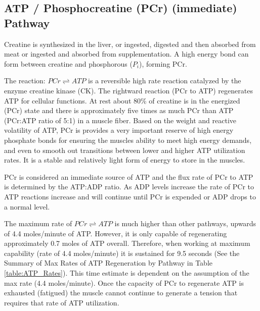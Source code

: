 \subsection{ATP / Phosphocreatine (PCr) (immediate) Pathway}

Creatine is synthesized in the liver, or ingested, digested and then absorbed from meat or ingested and absorbed from supplementation.\footnotemark{} A high energy bond can form between creatine and phosphorous ($P_i$), forming PCr.

The reaction: $PCr \rightleftharpoons ATP$ is a reversible high rate reaction catalyzed by the enzyme creatine kinase (CK). The rightward reaction (PCr to ATP) regenerates ATP for cellular functions. At rest about 80\% of creatine is in the energized (PCr) state and there is approximately five times as much PCr than ATP (PCr:ATP ratio of 5:1) in a muscle fiber. Based on the weight and reactive volatility of ATP, PCr is provides a very important reserve of high energy phosphate bonds for ensuring the muscles ability to meet high energy demands, and even to smooth out transitions between lower and higher ATP utilization rates.\footnotemark{} It is a stable and relatively light form of energy to store in the muscles.

PCr is considered an immediate source of ATP and the flux rate of PCr to ATP is determined by the ATP:ADP ratio. As ADP levels increase the rate of PCr to ATP reactions increase and will continue until PCr is expended or ADP drops to a normal level.

The maximum rate of $PCr \rightleftharpoons ATP$ is much higher than other pathways, upwards of 4.4 moles/minute of ATP. However, it is only capable of regenerating approximately 0.7 moles of ATP overall. Therefore, when working at maximum capability (rate of 4.4 moles/minute) it is sustained for 9.5 seconds (See the Summary of Max Rates of ATP Regeneration by Pathway in Table \ref{table:ATP_Rates}). This time estimate is dependent on the assumption of the max rate (4.4 moles/minute). Once the capacity of PCr to regenerate ATP is exhausted (fatigued) the muscle cannot continue to generate a tension that requires that rate of ATP utilization.

